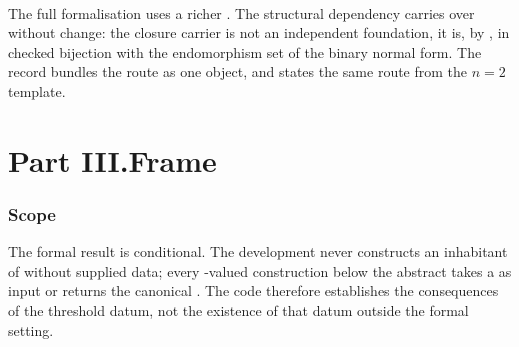 \documentclass[11pt]{article}
\begin{document}
\begin{code}
\>[0][@{}l@{\AgdaIndent{0}}]%
\>[2]\AgdaSymbol{(}\AgdaSpace{}%
\AgdaSymbol{:}\AgdaSpace{}%
\AgdaSpace{}%
\AgdaSymbol{)}\AgdaSpace{}%
\AgdaSpace{}%
\AgdaSpace{}%
\<%
\\
\>[0]\AgdaSpace{}%
\AgdaSpace{}%
\AgdaSymbol{=}\AgdaSpace{}%
\<%
\\
\>[0][@{}l@{\AgdaIndent{0}}]%
\>[2]\AgdaSymbol{\{}\AgdaSpace{}%
%
\>[23]\AgdaSymbol{=}\AgdaSpace{}%
\<%
\\
%
\>[2]\AgdaSymbol{;}\AgdaSpace{}%
%
\>[23]\AgdaSymbol{=}\AgdaSpace{}%
\<%
\\
%
\>[2]\AgdaSymbol{;}\AgdaSpace{}%
%
\>[23]\AgdaSymbol{=}\AgdaSpace{}%
\<%
\\
%
\>[2]\AgdaSymbol{;}\AgdaSpace{}%
%
\>[23]\AgdaSymbol{=}\AgdaSpace{}%
\AgdaSpace{}%
\AgdaSymbol{(}\AgdaSpace{}%
\AgdaSymbol{)}\<%
\\
%
\>[2]\AgdaSymbol{\}}\<%
\end{code}

The full formalisation uses a richer .  The
structural dependency carries over without change: the closure carrier
is not an independent foundation, it is, by
, in checked bijection with
the endomorphism set of the binary normal form.  The record
 bundles the route as one
object, and  states the
same route from the $n=2$ template.

\part*{Part III.\quad Frame}

\section{Scope}

The formal result is conditional.  The development never constructs an
inhabitant of  without supplied data; every
-valued construction below the abstract takes a
 as input or returns the canonical
.  The code therefore establishes the
consequences of the threshold datum, not the existence of that datum
outside the formal setting.
\end{document}
